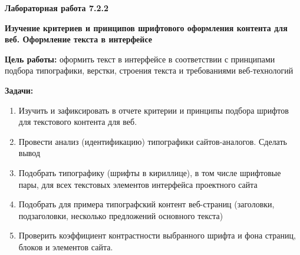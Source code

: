 
\graphicspath{ {7.2.2/models/} }

\pagestyle{fancy}
\fancyhead{}
\renewcommand{\headrulewidth}{0pt}


\begin{center}
    \textbf{Лабораторная работа 7.2.2}

    \textbf{Изучение критериев и принципов шрифтового оформления контента для веб. Оформление текста в интерфейсе}
\end{center}

\textbf{Цель работы:} оформить текст в интерфейсе в соответствии с принципами подбора типографики, верстки, строения текста и требованиями веб-технологий
\bigskip

\textbf{Задачи:}

\begin{enumerate}
    \item Изучить и зафиксировать в отчете критерии и принципы подбора шрифтов для текстового контента для веб.
    \item Провести анализ (идентификацию) типографики сайтов-аналогов. Сделать вывод
    \item Подобрать типографику (шрифты в кириллице), в том числе шрифтовые пары, для всех текстовых элементов интерфейса проектного сайта
    \item Подобрать для примера типографский контент веб-страниц (заголовки, подзаголовки, несколько предложений основного текста) 
    \item Проверить коэффициент контрастности выбранного шрифта и фона страниц, блоков и элементов сайта.
\end{enumerate}
\bigskip

\begin{itemize}
\end{itemize}
\bigskip

\noindent
\begin{minipage}{\linewidth}
\end{minipage}
\bigskip

